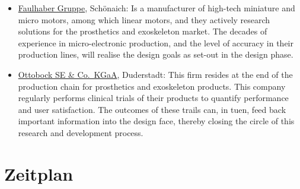 \documentclass[
  oneside]{book}
\begin{document}
\begin{itemize}
\item
  \href{https://www.faulhaber.com/en/markets/medical/exoskeletons-prosthetics/}{Faulhaber Gruppe}, Schönaich: Is a manufacturer of high-tech miniature and micro motors, among which linear motors, and they actively research solutions for the prosthetics and exoskeleton market. The decades of experience in micro-electronic production, and the level of accuracy in their production lines, will realise the design goals as set-out in the design phase.
\item
  \href{https://www.ottobock.com/de-de/startseite}{Ottobock SE \& Co.~KGaA}, Duderstadt: This firm resides at the end of the production chain for prosthetics and exoskeleton products. This company regularly performs clinical trials of their products to quantify performance and user satisfaction. The outcomes of these trails can, in tuen, feed back important information into the design face, thereby closing the circle of this research and development process.
\end{itemize}

\hypertarget{zeitplan}{%
\section{Zeitplan}\label{zeitplan}}

  
\end{document}
